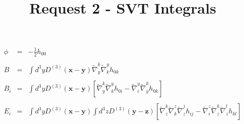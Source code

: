 \documentclass[10pt,letterpaper]{article}
\title{Request 2 - SVT Integrals}
\date{}
\numberwithin{equation}{section}
\begin{document}
 
\maketitle
\noindent 
\begin{eqnarray}
\phi &=& -\frac12 h_{00}
\\ \nonumber\\
B &=& \int d^3y D^{(3)}(\mathbf x - \mathbf y) \tilde\nabla^k_y \tilde\nabla_k^y h_{0k}
\\ \nonumber\\
B_i &=& \int d^3y D^{(3)}(\mathbf x - \mathbf y)\left[ \tilde\nabla^k_y \tilde\nabla_k^y h_{0i}
- \tilde\nabla_i^y \tilde\nabla^k_y h_{0k} \right]
\\ \nonumber\\
E_i &=& \int d^3y D^{(3)}(\mathbf x - \mathbf y) \int d^3z D^{(3)}(\mathbf y - \mathbf z)
\left[ \tilde\nabla^k_z \tilde\nabla_k^z \tilde\nabla^j_z h_{ij}-\tilde\nabla_i^z \tilde\nabla^k_z \tilde\nabla^l_z h_{kl} \right]
\end{eqnarray}
\end{document}

